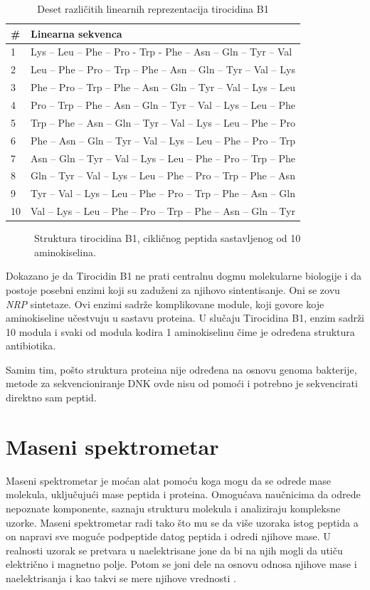 \documentclass[12pt,oneside]{memoir}
\begin{document}
\begin{table}[h]
\centering
\begin{tabular}{ll}
\toprule
\# & Linearna sekvenca \\
\midrule
1 & Lys – Leu – Phe – Pro - Trp - Phe – Asn – Gln – Tyr – Val \\
2 & Leu – Phe – Pro – Trp – Phe – Asn – Gln – Tyr – Val – Lys \\
3 & Phe – Pro – Trp – Phe – Asn – Gln – Tyr – Val – Lys – Leu \\
4 & Pro – Trp – Phe – Asn – Gln – Tyr – Val – Lys – Leu – Phe \\
5 & Trp – Phe – Asn – Gln – Tyr – Val – Lys – Leu – Phe – Pro \\
6 & Phe – Asn – Gln – Tyr – Val – Lys – Leu – Phe – Pro – Trp \\
7 & Asn – Gln – Tyr – Val – Lys – Leu – Phe – Pro – Trp – Phe \\
8 & Gln – Tyr – Val – Lys – Leu – Phe – Pro – Trp – Phe – Asn \\
9 & Tyr – Val – Lys – Leu – Phe – Pro – Trp – Phe – Asn – Gln \\
10 & Val – Lys – Leu – Phe – Pro – Trp – Phe – Asn – Gln – Tyr \\
\bottomrule
\end{tabular}
\caption{Deset različitih linearnih reprezentacija tirocidina B1}
\label{tab:linear_representations}
\end{table}

\begin{figure}[h]
  \centering
  
  \caption{Struktura tirocidina B1, cikličnog peptida sastavljenog od 10 aminokiselina.}
  \label{fig:tirocidin}
\end{figure}

Dokazano je da Tirocidin B1 ne prati centralnu dogmu molekularne biologije i da postoje posebni enzimi koji su zaduženi za njihovo sintentisanje. Oni se zovu \emph{NRP} sintetaze. Ovi enzimi sadrže komplikovane module, koji govore koje aminokiseline učestvuju u sastavu proteina. U slučaju Tirocidina B1, enzim sadrži 10 modula i svaki od modula kodira 1 aminokiselinu čime je određena struktura antibiotika.

Samim tim, pošto struktura proteina nije određena na osnovu genoma bakterije, metode za sekvencioniranje DNK ovde nisu od pomoći i potrebno je sekvencirati direktno sam peptid.

\section{Maseni spektrometar}
Maseni spektrometar je moćan alat pomoću koga mogu da se odrede mase molekula, uključujući mase peptida i proteina. Omogućava naučnicima da odrede nepoznate komponente, saznaju strukturu molekula i analiziraju kompleksne uzorke. Maseni spektrometar radi tako što mu se da više uzoraka istog peptida a on napravi sve moguće podpeptide datog peptida i odredi njihove mase. U realnosti uzorak se pretvara u naelektrisane jone da bi na njih mogli da utiču električno i magnetno polje. Potom se joni dele na osnovu odnosa njihove mase i naelektrisanja i kao takvi se mere njihove vrednosti \cite{spectrometer}.
\end{document}

